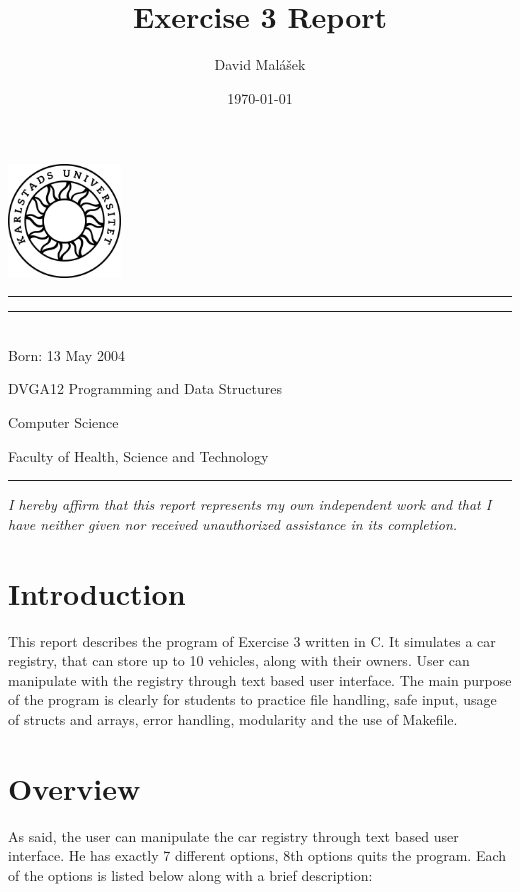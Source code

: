 \documentclass[12pt, a4paper, openright]{article}
\title{Exercise 3 Report}
\author{David Malášek}
\date{\today}
\makeatletter
\newcommand{\birthdate}{13 May 2004}
\newcommand{\affirmation}{I hereby affirm that this report represents my own independent work and that I have neither given nor received unauthorized assistance in its completion.}
\renewcommand{\maketitle}{%
  \bgroup\setlength{\parindent}{0pt}
  \begin{flushleft}

  \vspace*{-1cm}
  \noindent\includegraphics[width=3cm]{kaulogo.jpg}
  \vspace{2cm}

  \hrule\vspace{0.5cm}
  \textbf{\Huge\@title}
  \vspace{0.5cm}\hrule
  
  \vspace{0.5cm}
  \@author \\
  Born: \birthdate
  
  \vspace{0.5cm}
  \@date
  
  \vspace{0.5cm}
  DVGA12 Programming and Data Structures
  
  Computer Science
  
  Faculty of Health, Science and Technology
  
  \vspace{0.5cm}\hrule

  \vspace{1.5cm}
  \textit{\affirmation}

  \end{flushleft}
  \egroup
}
\makeatother
\begin{document}
\maketitle  %

\newpage

\tableofcontents  %

\newpage

\section{Introduction}

This report describes the program of Exercise 3 written in C. It simulates a car registry, that can store up to 10 vehicles, along with their owners. User can manipulate with the registry through text based user interface. The main purpose of the program is clearly for students to practice file handling, safe input, usage of structs and arrays, error handling, modularity and the use of Makefile.

\section{Overview}

As said, the user can manipulate the car registry through text based user interface. He has exactly 7 different options, 8th options quits the program. Each of the options is listed below along with a brief description:
\end{document}
